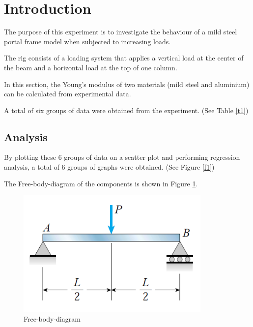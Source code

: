 \section{Introduction}

\FloatBarrier %


The purpose of this experiment is to investigate the behaviour of a mild steel portal frame model when subjected to increasing loads.

The rig consists of a loading system that applies a vertical load at the center of the beam and a horizontal load at the top of one column. 
























\iffalse


In this section, the Young's modulus of two materials 
(mild steel and aluminium) can be calculated from experimental data.

A total of six groups of data were obtained from the experiment. (See Table \ref{t1})

\subsection*{Analysis}

By plotting these 6 groups of data on a scatter plot and performing 
regression analysis, a total of 6 groups of graphs were obtained. (See Figure \ref{f1})

The Free-body-diagram of the components is shown in Figure \ref{ff1}.

\begin{figure}
    \centering
    \includegraphics[]{./fig/1.png}
    \caption{Free-body-diagram}
    \label{ff1}
\end{figure}

